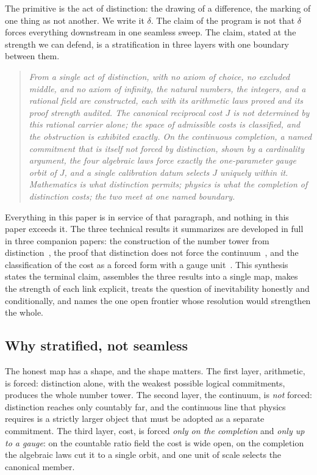 \documentclass[11pt,a4paper]{article}
\theoremstyle{definition}
\theoremstyle{remark}
\begin{document}
The primitive is the act of distinction: the drawing of a difference, the marking
of one thing as not another. We write it $\delta$. The claim of the program is not
that $\delta$ forces everything downstream in one seamless sweep. The claim, stated
at the strength we can defend, is a stratification in three layers with one
boundary between them.

\begin{quote}
\emph{From a single act of distinction, with no axiom of choice, no excluded
middle, and no axiom of infinity, the natural numbers, the integers, and a
rational field are constructed, each with its arithmetic laws proved and its
proof strength audited. The canonical reciprocal cost $J$ is not determined by
this rational carrier alone; the space of admissible costs is classified, and the
obstruction is exhibited exactly. On the continuous completion, a named
commitment that is itself not forced by distinction, shown by a cardinality
argument, the four algebraic laws force exactly the one-parameter gauge orbit of
$J$, and a single calibration datum selects $J$ uniquely within it. Mathematics
is what distinction permits; physics is what the completion of distinction costs;
the two meet at one named boundary.}
\end{quote}

Everything in this paper is in service of that paragraph, and nothing in this
paper exceeds it. The three technical results it summarizes are developed in full
in three companion papers: the construction of the number tower from
distinction~\cite{DeltaArithmetic}, the proof that distinction does not force the
continuum~\cite{DeltaContinuum}, and the classification of the cost as a forced
form with a gauge unit~\cite{DeltaCost}. This synthesis states the terminal claim,
assembles the three results into a single map, makes the strength of each link
explicit, treats the question of inevitability honestly and conditionally, and
names the one open frontier whose resolution would strengthen the whole.

\subsection{Why stratified, not seamless}

The honest map has a shape, and the shape matters. The first layer, arithmetic, is
forced: distinction alone, with the weakest possible logical commitments,
produces the whole number tower. The second layer, the continuum, is \emph{not}
forced: distinction reaches only countably far, and the continuous line that
physics requires is a strictly larger object that must be adopted as a separate
commitment. The third layer, cost, is forced \emph{only on the completion} and
\emph{only up to a gauge}: on the countable ratio field the cost is wide open, on
the completion the algebraic laws cut it to a single orbit, and one unit of scale
selects the canonical member.
\end{document}
